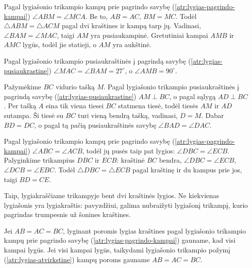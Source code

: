 \documentclass[12pt,a4paper,reqno]{amsart}
\theoremstyle{plain}\newtheorem{theorem}{Teorema}[section]
\theoremstyle{definition}
\theoremstyle{remark}\newtheorem{remark}[theorem]{Pastaba}\newtheorem*{remark*}{Pastaba}
\theoremstyle{definition}\newtheorem*{problem*}{Uždavinys}
\begin{document}
\begin{solution}[\ref{atr:lygias-pusiaukrastine}] Pagal lygiašonio trikampio kampų prie pagrindo savybę (\ref{atr:lygias-pagrindo-kampai}) $\angle ABM=\angle MCA$. Be to, $AB=AC$, $BM=MC$. Todėl $\triangle ABM=\triangle ACM$ pagal dvi kraštines ir kampą tarp jų. Vadinasi, $\angle BAM=\angle MAC$, taigi $AM$ yra pusiaukampinė. Gretutiniai kampai $AMB$ ir $AMC$ lygūs, todėl jie statieji, o $AM$ yra aukštinė. \end{solution}
\begin{solution}[\ref{uzd:lygias-pusiaukrastine-01}] Pagal lygiašonio trikampio pusiaukraštinės į pagrindą savybę (\ref{atr:lygias-pusiaukrastine}) $\angle MAC=\angle BAM=27^\circ$, o $\angle AMB=90^\circ$. \end{solution}
\begin{solution}[\ref{uzd:lygias-aukstine-01}] Pažymėkime $BC$ vidurio tašką $M$. Pagal lygiašonio trikampio pusiaukraštinės į pagrindą savybę (\ref{atr:lygias-pusiaukrastine}) $AM\perp BC$, o pagal sąlygą $AD\perp BC$. Per tašką $A$ eina tik viena tiesei $BC$ statmena tiesė, todėl tiesės $AM$ ir $AD$ sutampa. Ši tiesė su $BC$ turi vieną bendrą tašką, vadinasi, $D=M$. Dabar $BD=DC$, o pagal tą pačią pusiaukraštinės savybę $\angle BAD=\angle DAC$. \end{solution}
\begin{solution}[\ref{uzd:lygias-pusiaukampines-01}] Pagal lygiašonio trikampio kampų prie pagrindo savybę (\ref{atr:lygias-pagrindo-kampai}) $\angle ABC=\angle ACB$, todėl jų pusės taip pat lygios: $\angle DBC=\angle ECB$. Palyginkime trikampius $DBC$ ir $ECB$: kraštinė $BC$ bendra, $\angle DBC=\angle ECB$, $\angle DCB=\angle EBC$. Todėl $\triangle DBC=\triangle ECB$ pagal kraštinę ir du kampus prie jos, taigi $BD=CE$. \end{solution}
\begin{solution}[\ref{uzd:lygiakrastis-supratimas-01}] Taip, lygiakraščiame trikampyje bent dvi kraštinės lygios. Ne kiekvienas lygiašonis yra lygiakraštis: pavyzdžiui, galima nubraižyti lygiašonį trikampį, kurio pagrindas trumpesnis už šonines kraštines. \end{solution}
\begin{solution}[\ref{atr:lygiakrastis-kampai}] Jei $AB=AC=BC$, lyginant poromis lygias kraštines pagal lygiašonio trikampio kampų prie pagrindo savybę (\ref{atr:lygias-pagrindo-kampai}) gauname, kad visi kampai lygūs. Jei visi kampai lygūs, taikydami lygiašonio trikampio požymį (\ref{atr:lygias-atvirkstine}) kampų poroms gauname $AB=AC=BC$. \end{solution}
\end{document}
